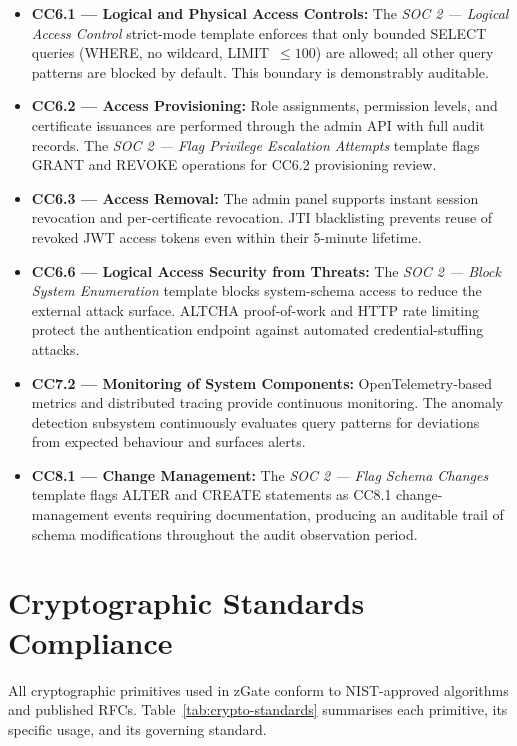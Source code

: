 \begin{itemize}
    \item \textbf{CC6.1 --- Logical and Physical Access Controls:} The \textit{SOC 2 --- Logical Access Control} strict-mode template enforces that only bounded SELECT queries (WHERE, no wildcard, LIMIT~$\leq 100$) are allowed; all other query patterns are blocked by default. This boundary is demonstrably auditable.
    \item \textbf{CC6.2 --- Access Provisioning:} Role assignments, permission levels, and certificate issuances are performed through the admin API with full audit records. The \textit{SOC 2 --- Flag Privilege Escalation Attempts} template flags GRANT and REVOKE operations for CC6.2 provisioning review.
    \item \textbf{CC6.3 --- Access Removal:} The admin panel supports instant session revocation and per-certificate revocation. JTI blacklisting prevents reuse of revoked JWT access tokens even within their 5-minute lifetime.
    \item \textbf{CC6.6 --- Logical Access Security from Threats:} The \textit{SOC 2 --- Block System Enumeration} template blocks system-schema access to reduce the external attack surface. ALTCHA proof-of-work and HTTP rate limiting protect the authentication endpoint against automated credential-stuffing attacks.
    \item \textbf{CC7.2 --- Monitoring of System Components:} OpenTelemetry-based metrics and distributed tracing provide continuous monitoring. The anomaly detection subsystem continuously evaluates query patterns for deviations from expected behaviour and surfaces alerts.
    \item \textbf{CC8.1 --- Change Management:} The \textit{SOC 2 --- Flag Schema Changes} template flags ALTER and CREATE statements as CC8.1 change-management events requiring documentation, producing an auditable trail of schema modifications throughout the audit observation period.
\end{itemize}

\section{Cryptographic Standards Compliance}

All cryptographic primitives used in zGate conform to NIST-approved algorithms and published RFCs. Table~\ref{tab:crypto-standards} summarises each primitive, its specific usage, and its governing standard.

